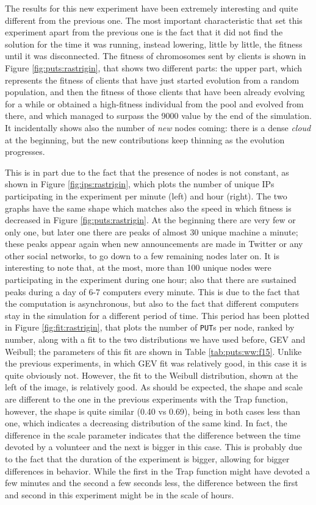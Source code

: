 \documentclass[journal,onecolumn]{IEEEtran}
\begin{document}
The results for this new experiment have been extremely interesting
and quite different from the previous one. The most important
characteristic that set this experiment apart from the previous one is
the fact that it did not find the solution for the time it was
running, instead lowering, little by little, the fitness until it was
disconnected. The fitness of chromosomes sent by clients is shown in
Figure \ref{fig:puts:rastrigin}, that shows two different parts: the
upper part, which represents the fitness of clients that have just
started evolution from a random population, and then the fitness of
those clients that have been already evolving for a while or obtained
a high-fitness individual from the pool and evolved from there, and
which managed to surpass the 9000 value by the end of the
simulation. It incidentally shows also the number of {\em new} nodes
coming: there is a dense {\em cloud} at the beginning, but the new
contributions keep thinning as the evolution progresses. 

This is in part due to the fact that the presence of nodes is not
constant, as shown in Figure \ref{fig:ips:rastrigin}, which plots the
number of unique IPs participating in the experiment per minute (left)
and hour (right). The two graphs have the same shape which matches
also the speed in which fitness is decreased in Figure
\ref{fig:puts:rastrigin}. At the beginning there are very few or only
one, but later one there are peaks of almost 30 unique machine a
minute; these peaks appear again when new announcements are made in
Twitter or any other social networks, to go down to a few remaining
nodes later on. It is interesting to note that, at the most, more than
100 unique nodes were participating in the experiment during one hour;
also that there are sustained peaks during a day of 6-7 computers
every minute. This is due to the fact that the computation is
asynchronous, but also to the fact that different computers stay in
the simulation for a different period of time. This period has been
plotted in Figure \ref{fig:fit:rastrigin}, that plots the number of
{\tt PUT}s per node, ranked by number, along with a fit to the two
distributions we have used before, GEV and Weibull; the parameters of
this fit are shown in Table \ref{tab:puts:ww:f15}. Unlike the previous
experiments, in which GEV fit was relatively good, in this case it is
quite obviously not. However, the fit to the Weibull distribution,
shown at the left of the image, is relatively good. As should be
expected, the shape and scale are different to the one in the previous
experiments with the Trap function, however, the shape is quite
similar (0.40 vs 0.69), being in both cases less than one, which
indicates a decreasing distribution of the same kind. In fact, the
difference in the scale parameter indicates that the difference
between the time devoted by a volunteer and the next is bigger in this
case. This is probably due to the fact that the duration of the
experiment is bigger, allowing for bigger differences in
behavior. While the first in the Trap function might have devoted a
few minutes and the second a few seconds less, the difference between
the first and second in this experiment might be in the scale of
hours. 
\end{document}
